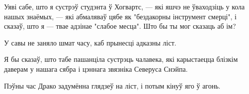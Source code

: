 \begin{writtenNoteCursive}
Уяві сабе, што я сустрэў студэнта ў Хогвартс, --- які яшчэ не ўваходзіць у 
кола нашых знаёмых, --- які абмаляваў цябе як "бездакорны інструмент смерці",
і сказаў, што я --- твае адзінае "слабое месца". Што бы ты мог сказаць аб ім?
\end{writtenNoteCursive}

У савы не заняло шмат часу, каб прынесці адказны ліст.

\begin{writtenNoteCursive}
Я бы сказаў, што табе пашанціла сустрэць чалавека, які карыстаецца блізкім даверам у
нашага сябра і цэннага звязніка Северуса Снэйпа. 
\end{writtenNoteCursive}

Пэўны час Драко задумённа глядзеў на ліст, і потым кінуў яго ў агонь.

